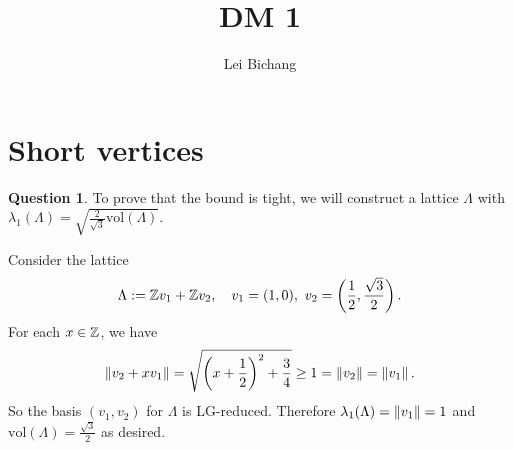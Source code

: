 \documentclass{article}
\title{DM 1}
\author{Lei Bichang}
\newcommand{\vol}{\mathrm{vol}}
\theoremstyle{definition}
\newtheorem{question}{Question}[section]
\begin{document}
\maketitle

\section{Short vertices}

\begin{question}
    To prove that the bound is tight,
    we will construct a lattice $\Lambda$ with $\lambda_1(\Lambda) = \sqrt{\frac{2}{\sqrt{3}}\vol(\Lambda)}$.

    Consider the lattice \[\Lambda := \mathbb{Z} v_1 + \mathbb{Z} v_2, \quad v_1 = (1, 0),\ v_2 = \left( \frac{1}{2},\frac{\sqrt{3}}{2} \right).\]
    For each $x\in\mathbb{Z}$, we have
    \[\left\| v_2 + xv_1\right\| = \sqrt{\left( x + \frac{1}{2} \right)^2 + \frac{3}{4}}\ge 1 = \left\| v_2\right\| = \left\| v_1\right\|.\]
    So the basis $(v_1, v_2)$ for $\Lambda$ is LG-reduced.
    Therefore $\lambda_1(\Lambda) = \left\| v_1\right\| = 1$ and $\vol(\Lambda) = \frac{\sqrt{3}}{2}$ as desired.
\end{question}
\end{document}
